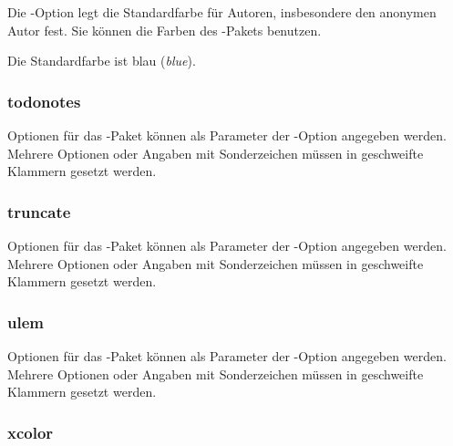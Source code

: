 Die -Option legt die Standardfarbe für Autoren, insbesondere den anonymen Autor fest.
Sie können die Farben des -Pakets benutzen.

Die Standardfarbe ist blau (\emph{blue}).



\subsubsection{todonotes}


Optionen für das -Paket können als Parameter der -Option angegeben werden.
Mehrere Optionen oder Angaben mit Sonderzeichen müssen in geschweifte Klammern gesetzt werden.




\subsubsection{truncate}


Optionen für das -Paket können als Parameter der -Option angegeben werden.
Mehrere Optionen oder Angaben mit Sonderzeichen müssen in geschweifte Klammern gesetzt werden.




\subsubsection{ulem}


Optionen für das -Paket können als Parameter der -Option angegeben werden.
Mehrere Optionen oder Angaben mit Sonderzeichen müssen in geschweifte Klammern gesetzt werden.




\subsubsection{xcolor}

